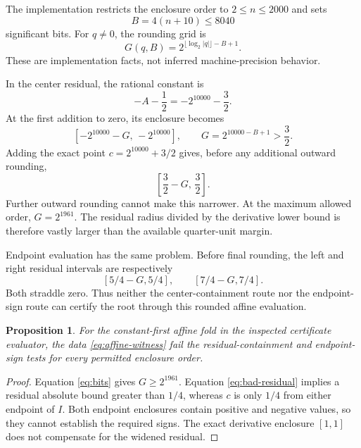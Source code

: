 \documentclass[11pt,a4paper]{article}
\newtheorem{proposition}{Proposition}[section]
\newcommand{\code}[1]{\texttt{\detokenize{#1}}}
\begin{document}
The implementation restricts the enclosure order to $2\le n\le2000$ and sets
\begin{equation}\label{eq:bits}
 B=4(n+10)\le8040
\end{equation}
significant bits. For $q\ne0$, the rounding grid is
\begin{equation}
 G(q,B)=2^{\lfloor\log_2|q|\rfloor-B+1}.
\end{equation}
These are implementation facts, not inferred machine-precision behavior.\cite{certificates}

In the center residual, the rational constant is
\[
 -A-\frac12=-2^{10000}-\frac32.
\]
At the first addition to zero, its enclosure becomes
\begin{equation}\label{eq:constant-rounded}
 \left[-2^{10000}-G,\,-2^{10000}\right],
 \qquad G=2^{10000-B+1}>\frac32.
\end{equation}
Adding the exact point $c=2^{10000}+3/2$ gives, before any additional outward rounding,
\begin{equation}\label{eq:bad-residual}
 \left[\frac32-G,\,\frac32\right].
\end{equation}
Further outward rounding cannot make this narrower. At the maximum allowed order, $G=2^{1961}$. The residual radius divided by the derivative lower bound is therefore vastly larger than the available quarter-unit margin.

Endpoint evaluation has the same problem. Before final rounding, the left and right residual intervals are respectively
\[
 [5/4-G,5/4],\qquad[7/4-G,7/4].
\]
Both straddle zero. Thus neither the center-containment route nor the endpoint-sign route can certify the root through this rounded affine evaluation.

\begin{proposition}
For the constant-first affine \code{Plus} fold in the inspected certificate evaluator, the data \eqref{eq:affine-witness} fail the residual-containment and endpoint-sign tests for every permitted enclosure order.
\end{proposition}
\begin{proof}
Equation \eqref{eq:bits} gives $G\ge2^{1961}$. Equation \eqref{eq:bad-residual} implies a residual absolute bound greater than $1/4$, whereas $c$ is only $1/4$ from either endpoint of $I$. Both endpoint enclosures contain positive and negative values, so they cannot establish the required signs. The exact derivative enclosure $[1,1]$ does not compensate for the widened residual.\end{proof}
\end{document}
